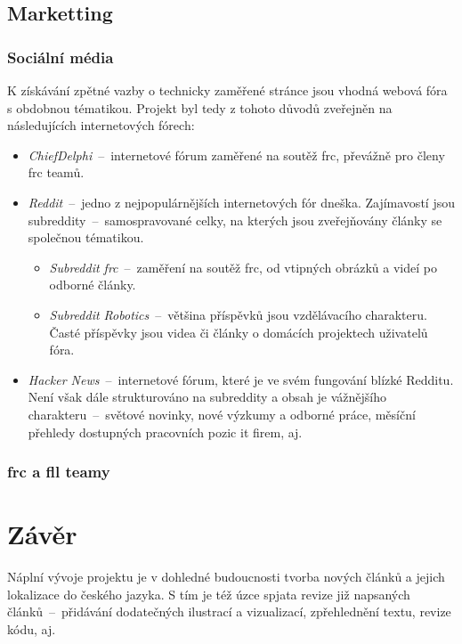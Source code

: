 \documentclass[a4paper, 12pt]{article}
\begin{document}
  \subsection{Marketting}

  \subsubsection{Sociální média}
  K získávání zpětné vazby o technicky zaměřené stránce jsou vhodná webová fóra s obdobnou tématikou. Projekt byl tedy z tohoto důvodů zveřejněn na následujících internetových fórech:

  {\parskip=0pt
  \begin{itemize}[topsep=\itemsep]
    \item \emph{ChiefDelphi}~--~internetové fórum zaměřené na soutěž \gls{frc}, převážně pro členy \gls{frc} teamů.
    \item \emph{Reddit}~--~jedno z nejpopulárnějších internetových fór dneška. Zajímavostí jsou subreddity~--~samospravované celky, na kterých jsou zveřejňovány články se společnou tématikou.
    \begin{itemize}[topsep=0pt]
      \item \emph{Subreddit \gls{frc}}~--~zaměření na soutěž \gls{frc}, od vtipných obrázků a videí po odborné články.
      \item \emph{Subreddit Robotics}~--~většina příspěvků jsou vzdělávacího charakteru. Časté příspěvky jsou videa či články o domácích projektech uživatelů fóra.
    \end{itemize}
    \item \emph{Hacker News}~--~internetové fórum, které je ve svém fungování blízké Redditu. Není však dále strukturováno na subreddity a obsah je vážnějšího charakteru~--~světové novinky, nové výzkumy a odborné práce, měsíční přehledy dostupných pracovních pozic \gls{it} firem, aj.
  \end{itemize}}


  \subsubsection{\acrshort{frc} a \acrshort{fll} teamy}

  \newpage

  \section{Závěr}
  Náplní vývoje projektu je v dohledné budoucnosti tvorba nových článků a jejich lokalizace do českého jazyka. S tím je též úzce spjata revize již napsaných článků~--~přidávání dodatečných ilustrací a vizualizací, zpřehlednění textu, revize kódu, aj.
\end{document}
